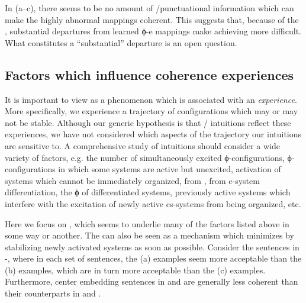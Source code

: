 \ea\label{ex:6:14}
\z
\z

In (a--c), there seems to be no amount of /punctuational information which can make the highly abnormal mappings coherent. This suggests that, because of the , substantial departures from learned ϕ-e mappings make achieving  more difficult. What constitutes a “substantial” departure is an open question.

\subsection{Factors which influence coherence experiences}

It is important to view  as a phenomenon which is associated with an \textit{experience}. More specifically, we experience a trajectory of  configurations which may or may not be stable. Although our generic hypothesis is that / intuitions reflect these experiences, we have not considered which aspects of the trajectory our intuitions are sensitive to. A comprehensive study of intuitions should consider a wide variety of factors, e.g. the number of simultaneously excited ϕ-con\-fi\-gu\-ra\-tions, ϕ-con\-fi\-gu\-ra\-tions in which some systems are active but unexcited, activation of systems which cannot be immediately organized,  from ,  from c-sys\-tem differentiation, the ϕ of differentiated systems, previously active systems which interfere with the excitation of newly active cs-sys\-tems from being organized, etc. 

  Here we focus on , which seems to underlie many of the factors listed above in some way or another. The  can also be seen as a mechanism which minimizes  by stabilizing newly activated systems as soon as possible. Consider the sentences in -, where in each set of sentences, the (a) examples seem more acceptable than the (b) examples, which are in turn more acceptable than the (c) examples. Furthermore, center embedding sentences in  and  are generally less coherent than their  counterparts in  and .  

